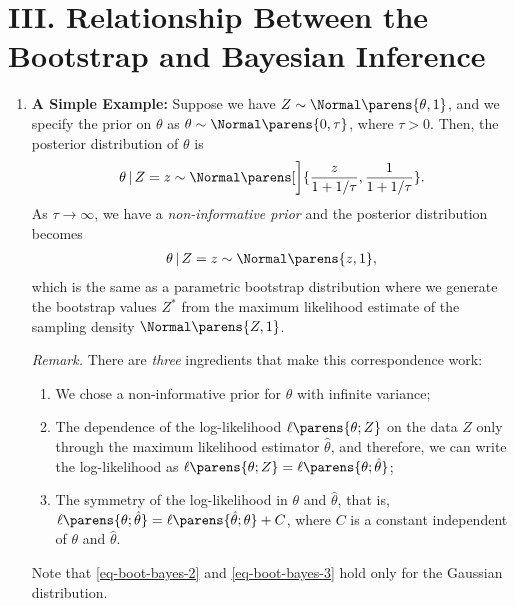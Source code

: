 \documentclass[12pt]{article}
\begin{document}
\section*{III. Relationship Between the Bootstrap and Bayesian Inference}

\begin{enumerate}[label=\textbf{\arabic*.}]
	
	\item \textbf{A Simple Example:} Suppose we have $Z \sim \Normal \parens{\theta, 1}$, and we specify the prior on $\theta$ as $\theta \sim \Normal \parens{0, \tau}$, where $\tau > 0$. Then, the posterior distribution of $\theta$ is 
	\begin{align}
		\theta \,\vert\, Z = z \sim \Normal \parens[\bigg]{\frac{z}{1+1/\tau}, \frac{1}{1+1/\tau}}. 
	\end{align}
	As $\tau \to \infty$, we have a \emph{non-informative prior} and the posterior distribution becomes 
	\begin{align}
		\theta \,\vert\, Z = z \sim \Normal \parens{z, 1}, 
	\end{align}
	which is the same as a parametric bootstrap distribution where we generate the bootstrap values $Z^*$ from the maximum likelihood estimate of the sampling density $\Normal \parens{Z, 1}$. 
	
	\textit{Remark.} There are \textit{three} ingredients that make this correspondence work: 
	\begin{enumerate}[label=(\roman*)]
		\item We chose a non-informative prior for $\theta$ with infinite variance; 
		\item \label{eq-boot-bayes-2} The dependence of the log-likelihood $\ell \parens{\theta; Z}$ on the data $Z$ only through the maximum likelihood estimator $\hat{\theta}$, and therefore, we can write the log-likelihood as $\ell \parens{\theta; Z} = \ell \parens{\theta; \hat{\theta}}$; 
		\item \label{eq-boot-bayes-3} The symmetry of the log-likelihood in $\theta$ and $\hat{\theta}$, that is, $\ell \parens{\theta; \hat{\theta}} = \ell \parens{\hat{\theta}; \theta} + C$, where $C$ is a constant independent of ${\theta}$ and $\hat{\theta}$. 
	\end{enumerate}
	Note that \ref{eq-boot-bayes-2} and \ref{eq-boot-bayes-3} hold only for the Gaussian distribution. 
	

\end{enumerate}
\end{document}

